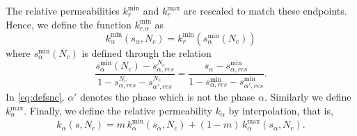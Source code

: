 \documentclass[11pt]{amsart}
\begin{document}
The relative permeabilities $k_r^{\min}$ and $k_r^{\max}$ are rescaled to match these
endpoints. Hence, we define the function $k_{r.\alpha}^{\min}$ as
\begin{equation}
\label{eq:rescaledkr}
k_{\alpha}^{\min}(s_\alpha, N_c) = k_r^{\min}(s_\alpha^{\min}(N_c))
\end{equation}
where $s_\alpha^{\min}(N_c)$ is defined through the relation
\begin{equation}
  \label{eq:defsnc}
  \frac{s_\alpha^{\min}(N_c) - s_{\alpha,res}^{N_c}}{1 - s_{\alpha,res}^{N_c} - s_{\alpha',res}^{N_c}} =   \frac{s_\alpha - s_{\alpha,res}^{\min}}{1 - s_{\alpha,res}^{\min} - s_{\alpha',res}^{\min}}.
\end{equation}
In \eqref{eq:defsnc}, $\alpha'$ denotes the phase which is not the phase $\alpha$. Similarly we
define $k_{\alpha}^{\max}$. Finally, we define the relative permeability $k_{\alpha}$ by
interpolation, that is,
\begin{equation}
  \label{eq:defkralpha}
  k_{\alpha}(s, N_c) = m\,k_{\alpha}^{\min}(s_\alpha, N_c) + (1 - m)\,k_{\alpha}^{\max}(s_\alpha, N_c).
\end{equation}
\end{document}
